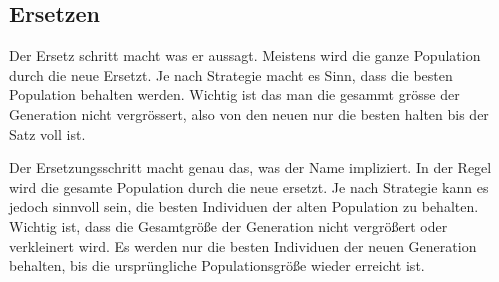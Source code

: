 %
%
%
%
\subsection{Ersetzen
\label{genetic_algorithm:replacement}}
Der Ersetz schritt macht was er aussagt. Meistens wird die ganze 
Population durch die neue Ersetzt. Je nach Strategie macht es Sinn, dass 
die besten Population behalten werden. Wichtig ist das man die gesammt 
grösse der Generation nicht vergrössert, also von den neuen nur die besten 
halten bis der Satz voll ist.

Der Ersetzungsschritt macht genau das, was der Name impliziert. In der 
Regel wird die gesamte Population durch die neue ersetzt. Je nach 
Strategie kann es jedoch sinnvoll sein, die besten Individuen der 
alten Population zu behalten. Wichtig ist, dass die Gesamtgröße der 
Generation nicht vergrößert oder verkleinert wird. Es werden  
nur die besten Individuen der neuen Generation behalten, bis die 
ursprüngliche Populationsgröße wieder erreicht ist.
